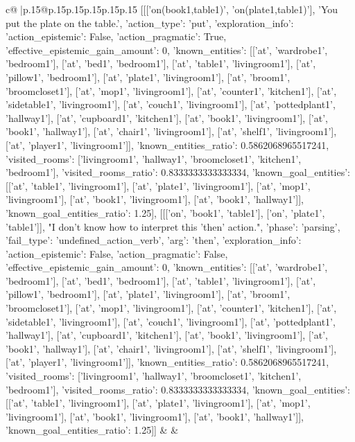 \documentclass{article}
\begin{document}
{\begin{supertabular}{c@{$\;$}|p{.15\linewidth}@{}p{.15\linewidth}p{.15\linewidth}p{.15\linewidth}p{.15\linewidth}p{.15\linewidth}}
{{{	 [[['on(book1,table1)', 'on(plate1,table1)'], 'You put the plate on the table.', {'action_type': 'put', 'exploration_info': {'action_epistemic': False, 'action_pragmatic': True, 'effective_epistemic_gain_amount': 0, 'known_entities': [['at', 'wardrobe1', 'bedroom1'], ['at', 'bed1', 'bedroom1'], ['at', 'table1', 'livingroom1'], ['at', 'pillow1', 'bedroom1'], ['at', 'plate1', 'livingroom1'], ['at', 'broom1', 'broomcloset1'], ['at', 'mop1', 'livingroom1'], ['at', 'counter1', 'kitchen1'], ['at', 'sidetable1', 'livingroom1'], ['at', 'couch1', 'livingroom1'], ['at', 'pottedplant1', 'hallway1'], ['at', 'cupboard1', 'kitchen1'], ['at', 'book1', 'livingroom1'], ['at', 'book1', 'hallway1'], ['at', 'chair1', 'livingroom1'], ['at', 'shelf1', 'livingroom1'], ['at', 'player1', 'livingroom1']], 'known_entities_ratio': 0.5862068965517241, 'visited_rooms': ['livingroom1', 'hallway1', 'broomcloset1', 'kitchen1', 'bedroom1'], 'visited_rooms_ratio': 0.8333333333333334, 'known_goal_entities': [['at', 'table1', 'livingroom1'], ['at', 'plate1', 'livingroom1'], ['at', 'mop1', 'livingroom1'], ['at', 'book1', 'livingroom1'], ['at', 'book1', 'hallway1']], 'known_goal_entities_ratio': 1.25}}], [[['on', 'book1', 'table1'], ['on', 'plate1', 'table1']], "I don't know how to interpret this 'then' action.", {'phase': 'parsing', 'fail_type': 'undefined_action_verb', 'arg': 'then', 'exploration_info': {'action_epistemic': False, 'action_pragmatic': False, 'effective_epistemic_gain_amount': 0, 'known_entities': [['at', 'wardrobe1', 'bedroom1'], ['at', 'bed1', 'bedroom1'], ['at', 'table1', 'livingroom1'], ['at', 'pillow1', 'bedroom1'], ['at', 'plate1', 'livingroom1'], ['at', 'broom1', 'broomcloset1'], ['at', 'mop1', 'livingroom1'], ['at', 'counter1', 'kitchen1'], ['at', 'sidetable1', 'livingroom1'], ['at', 'couch1', 'livingroom1'], ['at', 'pottedplant1', 'hallway1'], ['at', 'cupboard1', 'kitchen1'], ['at', 'book1', 'livingroom1'], ['at', 'book1', 'hallway1'], ['at', 'chair1', 'livingroom1'], ['at', 'shelf1', 'livingroom1'], ['at', 'player1', 'livingroom1']], 'known_entities_ratio': 0.5862068965517241, 'visited_rooms': ['livingroom1', 'hallway1', 'broomcloset1', 'kitchen1', 'bedroom1'], 'visited_rooms_ratio': 0.8333333333333334, 'known_goal_entities': [['at', 'table1', 'livingroom1'], ['at', 'plate1', 'livingroom1'], ['at', 'mop1', 'livingroom1'], ['at', 'book1', 'livingroom1'], ['at', 'book1', 'hallway1']], 'known_goal_entities_ratio': 1.25}}]] 
	  } 
	   } 
	   } 
	 & & \\ 
 

    \theutterance {}  


\end{supertabular}}
\end{document}
